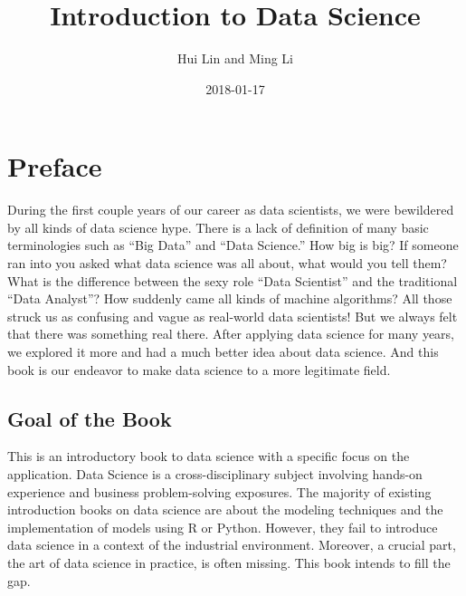 \documentclass[12pt,]{krantz}
\title{Introduction to Data Science}
\author{Hui Lin and Ming Li}
\date{2018-01-17}
\theoremstyle{definition}
\theoremstyle{definition}
\theoremstyle{remark}
\begin{document}
\maketitle

\thispagestyle{empty}
\begin{center}
\end{center}

\setlength{\abovedisplayskip}{-5pt}
\setlength{\abovedisplayshortskip}{-5pt}

{
\hypersetup{linkcolor=black}
\setcounter{tocdepth}{2}
\tableofcontents
}
\listoftables
\listoffigures
\chapter*{Preface}\label{preface}


During the first couple years of our career as data scientists, we were
bewildered by all kinds of data science hype. There is a lack of
definition of many basic terminologies such as ``Big Data'' and ``Data
Science.'' How big is big? If someone ran into you asked what data
science was all about, what would you tell them? What is the difference
between the sexy role ``Data Scientist'' and the traditional ``Data
Analyst''? How suddenly came all kinds of machine algorithms? All those
struck us as confusing and vague as real-world data scientists! But we
always felt that there was something real there. After applying data
science for many years, we explored it more and had a much better idea
about data science. And this book is our endeavor to make data science
to a more legitimate field.

\section*{Goal of the Book}\label{goal-of-the-book}


This is an introductory book to data science with a specific focus on
the application. Data Science is a cross-disciplinary subject involving
hands-on experience and business problem-solving exposures. The majority
of existing introduction books on data science are about the modeling
techniques and the implementation of models using R or Python. However,
they fail to introduce data science in a context of the industrial
environment. Moreover, a crucial part, the art of data science in
practice, is often missing. This book intends to fill the gap.
\end{document}
